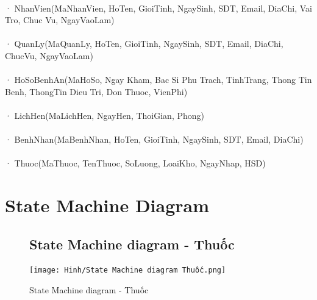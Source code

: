 \documentclass{report}
\begin{document}
\paragraph{}
· NhanVien(MaNhanVien, HoTen, GioiTinh, NgaySinh, SDT, Email, DiaChi, Vai Tro, Chuc Vu, NgayVaoLam)
\paragraph{}
· QuanLy(MaQuanLy, HoTen, GioiTinh, NgaySinh, SDT, Email, DiaChi, ChucVu, NgayVaoLam)
\paragraph{}
· HoSoBenhAn(MaHoSo, Ngay Kham, Bac Si Phu Trach, TinhTrang, Thong Tin Benh, ThongTin Dieu Tri, Don Thuoc, VienPhi)
\paragraph{}
· LichHen(MaLichHen, NgayHen, ThoiGian, Phong)
\paragraph{}
· BenhNhan(MaBenhNhan, HoTen, GioiTinh, NgaySinh, SDT, Email, DiaChi)
\paragraph{}
· Thuoc(MaThuoc, TenThuoc, SoLuong, LoaiKho, NgayNhap, HSD)




\pagebreak
\raggedright
\section{State Machine Diagram}
\begin{center}
	\begin{figure}[!htp]
		\subsection{State Machine diagram - Thuốc}
		\begin{center}
			\texttt{[image: Hinh/State Machine diagram Thuốc.png]}
		\end{center}
		\caption{State Machine diagram - Thuốc}
	\end{figure}
\end{center}
\end{document}
